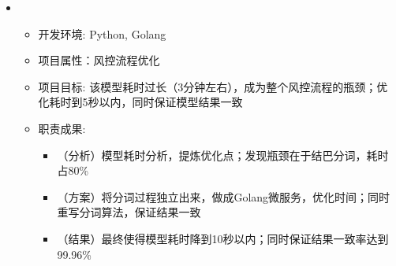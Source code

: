   \begin{itemize}[leftmargin=*]
    \item
      {\small
      \begin{itemize}
        \item 开发环境: Python, Golang
        \item 项目属性：风控流程优化
        \item 项目目标: 该模型耗时过长（3分钟左右），成为整个风控流程的瓶颈；优化耗时到5秒以内，同时保证模型结果一致
        \item 职责成果: 
        \begin{itemize}
          \item （分析）模型耗时分析，提炼优化点；发现瓶颈在于结巴分词，耗时占80\%
          \item （方案）将分词过程独立出来，做成Golang微服务，优化时间；同时重写分词算法，保证结果一致
          \item （结果）最终使得模型耗时降到10秒以内；同时保证结果一致率达到99.96\%
        \end{itemize}
      \end{itemize}
      }
  \end{itemize}
        
